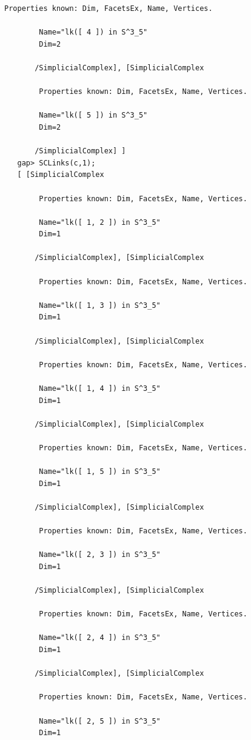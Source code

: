 \documentclass[a4paper,11pt]{report}
\begin{document}
{{{\begin{Verbatim}[commandchars=!@|,fontsize=\small,frame=single,label=Example]
        Properties known: Dim, FacetsEx, Name, Vertices.
       
        Name="lk([ 4 ]) in S^3_5"
        Dim=2
       
       /SimplicialComplex], [SimplicialComplex
       
        Properties known: Dim, FacetsEx, Name, Vertices.
       
        Name="lk([ 5 ]) in S^3_5"
        Dim=2
       
       /SimplicialComplex] ]
   gap> SCLinks(c,1);
   [ [SimplicialComplex
       
        Properties known: Dim, FacetsEx, Name, Vertices.
       
        Name="lk([ 1, 2 ]) in S^3_5"
        Dim=1
       
       /SimplicialComplex], [SimplicialComplex
       
        Properties known: Dim, FacetsEx, Name, Vertices.
       
        Name="lk([ 1, 3 ]) in S^3_5"
        Dim=1
       
       /SimplicialComplex], [SimplicialComplex
       
        Properties known: Dim, FacetsEx, Name, Vertices.
       
        Name="lk([ 1, 4 ]) in S^3_5"
        Dim=1
       
       /SimplicialComplex], [SimplicialComplex
       
        Properties known: Dim, FacetsEx, Name, Vertices.
       
        Name="lk([ 1, 5 ]) in S^3_5"
        Dim=1
       
       /SimplicialComplex], [SimplicialComplex
       
        Properties known: Dim, FacetsEx, Name, Vertices.
       
        Name="lk([ 2, 3 ]) in S^3_5"
        Dim=1
       
       /SimplicialComplex], [SimplicialComplex
       
        Properties known: Dim, FacetsEx, Name, Vertices.
       
        Name="lk([ 2, 4 ]) in S^3_5"
        Dim=1
       
       /SimplicialComplex], [SimplicialComplex
       
        Properties known: Dim, FacetsEx, Name, Vertices.
       
        Name="lk([ 2, 5 ]) in S^3_5"
        Dim=1
       

\end{Verbatim}}}}
\end{document}
